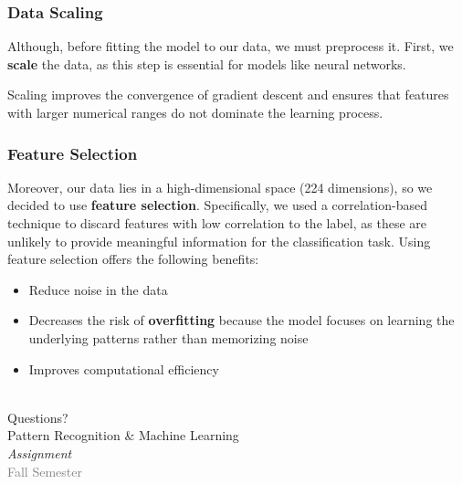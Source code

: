 \documentclass{beamer}
\begin{document}
\begin{frame}
\frametitle{Data Scaling}
Although, before fitting the model to our data, we must preprocess it. First, we \textbf{scale} the data, as this step is essential for models like neural networks.
\vspace{0.5cm}

Scaling improves the convergence of gradient descent and ensures that features with larger numerical ranges do not dominate the learning process.

\end{frame}

\begin{frame}
\frametitle{Feature Selection}
Moreover, our data lies in a high-dimensional space (224 dimensions), so we decided to use \textbf{feature selection}. Specifically, we used a correlation-based technique to discard features with low correlation to the label, as these are unlikely to provide meaningful information for the classification task. Using feature selection offers the following benefits:
\vspace{0.5cm}
\begin{itemize}
    \item Reduce noise in the data
    \item Decreases the risk of \textbf{overfitting} because the model focuses on learning the underlying patterns rather than memorizing noise
    \item Improves computational efficiency
\end{itemize}
\end{frame}

\begin{frame}[plain]
    \begin{center}
        
         \hfill
         \\[1cm]

        {\Huge Questions?} \\[0.5cm]
        {\large Pattern Recognition \& Machine Learning \\ \emph{\textcolor[RGB]{139,0,0}{Assignment}}} \\[1cm]

        {\tiny \textcolor{gray}{Fall Semester}}
    \end{center}
\end{frame}
\end{document}
